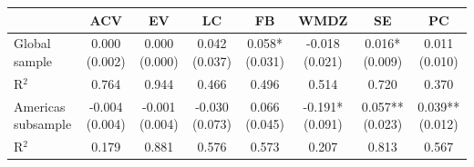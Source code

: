 \begin{tabular}{lccccccc}
\toprule
 & ACV & EV & LC & FB & WMDZ & SE & PC \\
\midrule
Global sample & 0.000 (0.002) & 0.000 (0.000) & 0.042 (0.037) & 0.058* (0.031) & -0.018 (0.021) & 0.016* (0.009) & 0.011 (0.010) \\
R$^2$ & 0.764 & 0.944 & 0.466 & 0.496 & 0.514 & 0.720 & 0.370 \\
Americas subsample & -0.004 (0.004) & -0.001 (0.004) & -0.030 (0.073) & 0.066 (0.045) & -0.191* (0.091) & 0.057** (0.023) & 0.039** (0.012) \\
R$^2$ & 0.179 & 0.881 & 0.576 & 0.573 & 0.207 & 0.813 & 0.567 \\
\bottomrule
\end{tabular}
